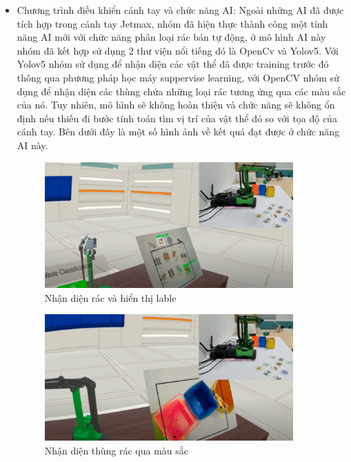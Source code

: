 \begin{itemize}
    \item Chương trình điều khiển cánh tay và chức năng AI: Ngoài những AI đã được tích hợp trong cánh tay Jetmax, nhóm đã hiện thực thành công một tính năng AI mới với chức năng phân loại rác bán tự động, ở mô hình AI này nhóm đã kết hợp sử dụng 2 thư viện nổi tiếng đó là OpenCv và Yolov5. Với Yolov5 nhóm sử dụng để nhận diện các vật thể đã được training trước đó thông qua phương pháp học máy suppervise learning, với OpenCV nhóm sử dụng để nhận diện các thùng chứa những loại rác tương ứng qua các màu sắc của nó. Tuy nhiên, mô hình sẽ không hoàn thiện và chức năng sẽ không ổn định nếu thiếu đi bước tính toán tìm vị trí của vật thể đó so với tọa độ của cánh tay. Bên dưới đây là một số hình ảnh về kết quả đạt được ở chức năng AI này.
    
    \begin{figure}[H]
    \centering
    \includegraphics[width=0.9\textwidth]{Images/Result/ai-result-1.jpg}
    \caption{Nhận diện rác và hiển thị lable}
    \end{figure}
    
    \begin{figure}[H]
    \centering
    \includegraphics[width=0.9\textwidth]{Images/Result/ai-result-2.jpg}
    \caption{Nhận diện thùng rác qua màu sắc}
    \end{figure} 
\end{itemize}



